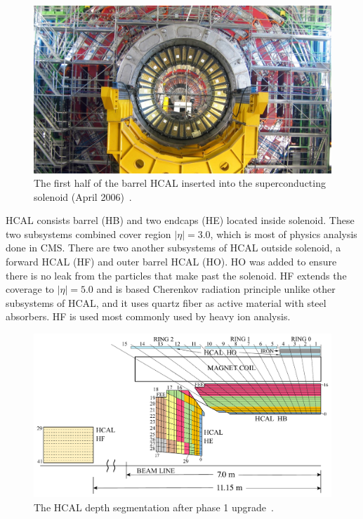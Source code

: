 \begin{figure}[!ht]
  \centering
  \includegraphics[width=\textwidth]{figures/cms_hcal_hb_inserted.jpg}
  \caption[The first half of the barrel \gls{HCAL} inserted into the
    superconducting solenoid (April 2006)]%
  {The first half of the barrel \gls{HCAL} inserted into the
    superconducting solenoid (April 2006)~\cite{image-cms-hcal-inserted}.}%
  \label{fig:cms-hcal-inserted}
\end{figure}

\gls{HCAL} consists barrel (HB) and two endcaps (HE) located inside solenoid.
These two subsystems combined cover region \( |\eta| = 3.0 \), which
is most of physics analysis done in \gls{CMS}.
There are two another subsystems of \gls{HCAL} outside solenoid,
a forward \gls{HCAL} (HF) and outer barrel \gls{HCAL} (HO).
HO was added to ensure there is no leak from the particles that
make past the solenoid. HF extends the coverage
to \(|\eta| = 5.0\) and is based Cherenkov radiation principle unlike
other subsystems of \gls{HCAL}, and it uses quartz fiber
as active material with steel absorbers.
HF is used most commonly used by heavy ion analysis.

\begin{figure}[!ht]
  \centering
  \includegraphics[width=\textwidth]{figures/cms_hcal_depth_seg.pdf}
  \caption[The \gls{HCAL} depth segmentation after phase 1 upgrade]%
  {The \gls{HCAL} depth segmentation after phase 1 upgrade~\cite{image-cms-hcal-depth}.}%
  \label{fig:cms-hcal-depth}
\end{figure}

